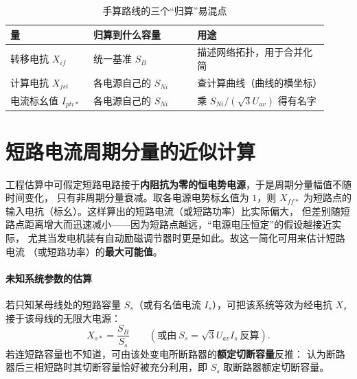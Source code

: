 \begin{table}[htbp]
  \centering
  \caption{手算路线的三个“归算”易混点}
  \small
  \begin{tabular}{@{}p{0.24\linewidth}p{0.30\linewidth}p{0.38\linewidth}@{}}
    \toprule
    量 & 归算到什么容量 & 用途 \\
    \midrule
    转移电抗 $X_{if}$ & 统一基准 $S_B$ & 描述网络拓扑，用于合并化简 \\
    计算电抗 $X_{jsi}$ & 各电源自己的 $S_{Ni}$ & 查计算曲线（曲线的横坐标） \\
    电流标幺值 $I_{pti*}$ & 各电源自己的 $S_{Ni}$ & 乘 $S_{Ni}/(\sqrt{3}U_{av})$ 得有名字 \\
    \bottomrule
  \end{tabular}
\end{table}


\section{短路电流周期分量的近似计算}

工程估算中可假定短路电路接于\textbf{内阻抗为零的恒电势电源}，于是周期分量幅值不随时间变化，
只有非周期分量衰减。取各电源电势标幺值为 $1$，则
$X_{ff*}$ 为短路点的输入电抗（标幺）。这样算出的短路电流（或短路功率）比实际偏大，
但差别随短路点距离增大而迅速减小——因为短路点越远，“电源电压恒定”的假设越接近实际，
尤其当发电机装有自动励磁调节器时更是如此。故这一简化可用来估计短路电流
（或短路功率）的\textbf{最大可能值}。

\paragraph{未知系统参数的估算}
若只知某母线处的短路容量 $S_s$（或有名值电流 $I_s$），可把该系统等效为经电抗 $X_s$
接于该母线的无限大电源：
\begin{equation}
  X_{s*}=\frac{S_B}{S_s}\qquad\left(\text{或由}\ S_s=\sqrt{3}U_{av}I_s\ \text{反算}\right).
\end{equation}
若连短路容量也不知道，可由该处变电所断路器的\textbf{额定切断容量}反推：
认为断路器后三相短路时其切断容量恰好被充分利用，即 $S_s$ 取断路器额定切断容量。


